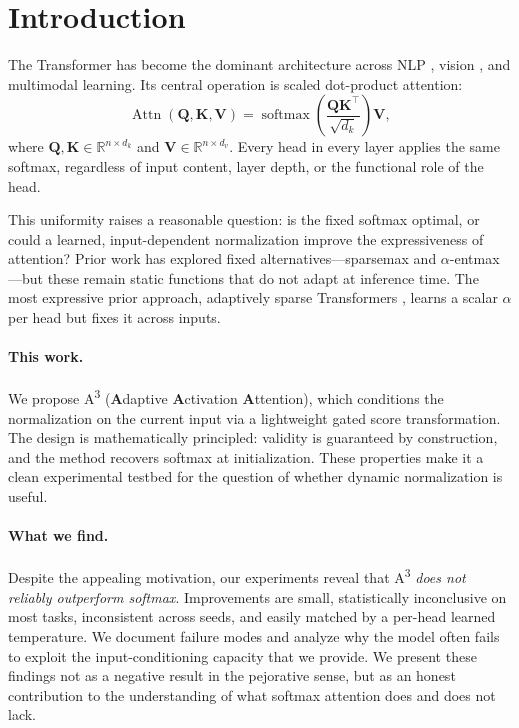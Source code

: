 \documentclass[11pt]{article}
\newcommand{\softmax}{\operatorname{softmax}}
\newcommand{\AAA}{\textsc{A\textsuperscript{3}}}
\newcommand{\RR}{\mathbb{R}}
\newcommand{\bQ}{\mathbf{Q}}
\newcommand{\bK}{\mathbf{K}}
\newcommand{\bV}{\mathbf{V}}
\begin{document}
\section{Introduction}
\label{sec:intro}

The Transformer \citep{vaswani2017attention} has become the dominant architecture across NLP \citep{devlin2019bert,brown2020gpt3}, vision \citep{dosovitskiy2021image}, and multimodal learning. Its central operation is scaled dot-product attention:
\begin{equation}
  \operatorname{Attn}(\bQ,\bK,\bV)
    = \softmax\!\left(\frac{\bQ\bK^\top}{\sqrt{d_k}}\right)\bV,
  \label{eq:standard_attn}
\end{equation}
where $\bQ,\bK \in \RR^{n \times d_k}$ and $\bV \in \RR^{n \times d_v}$. Every head in every layer applies the same softmax, regardless of input content, layer depth, or the functional role of the head.

This uniformity raises a reasonable question: is the fixed softmax optimal, or could a learned, input-dependent normalization improve the expressiveness of attention? Prior work has explored fixed alternatives---sparsemax \citep{martins2016softmax} and $\alpha$-entmax \citep{peters2019sparse}---but these remain static functions that do not adapt at inference time. The most expressive prior approach, adaptively sparse Transformers \citep{correia2019adaptively}, learns a scalar $\alpha$ per head but fixes it across inputs.

\paragraph{This work.} We propose \AAA{} (\textbf{A}daptive \textbf{A}ctivation \textbf{A}ttention), which conditions the normalization on the current input via a lightweight gated score transformation. The design is mathematically principled: validity is guaranteed by construction, and the method recovers softmax at initialization. These properties make it a clean experimental testbed for the question of whether dynamic normalization is useful.

\paragraph{What we find.} Despite the appealing motivation, our experiments reveal that \AAA{} \emph{does not reliably outperform softmax}. Improvements are small, statistically inconclusive on most tasks, inconsistent across seeds, and easily matched by a per-head learned temperature. We document failure modes and analyze why the model often fails to exploit the input-conditioning capacity that we provide. We present these findings not as a negative result in the pejorative sense, but as an honest contribution to the understanding of what softmax attention does and does not lack.
\end{document}
